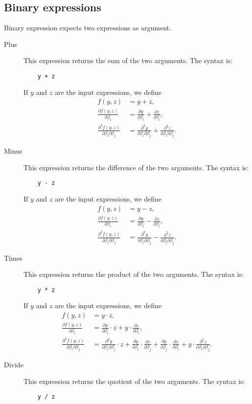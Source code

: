 \documentclass[12pt,a4paper]{article}
\begin{document}
\subsection{Binary expressions}
Binary expression expects two expressions as argument.   

\begin{description}
\item[Plus] This expression returns the sum of the two arguments. The syntax is: 
  \begin{lstlisting}
    y + z
  \end{lstlisting}
  If $y$ and $z$ are the input expressions, we define
  \begin{align*}
    f(y, z) &= y + z, \\
    \frac{\partial f(y, z)}{\partial \beta_i} &= \frac{\partial y}{\partial \beta_i} + \frac{\partial z}{\partial \beta_i}, \\
    \frac{\partial^2 f(y, z)}{\partial \beta_i\partial \beta_j} &=
    \frac{\partial^2 y}{\partial \beta_i \partial \beta_j} + \frac{\partial^2 z}{\partial \beta_i \partial \beta_j}.
  \end{align*}
\item[Minus] This expression returns the difference of the two arguments. The syntax is: 
  \begin{lstlisting}
    y - z
  \end{lstlisting}
  If $y$ and $z$ are the input expressions, we define
  \begin{align*}
    f(y, z) &= y - z, \\
    \frac{\partial f(y, z)}{\partial \beta_i} &= \frac{\partial y}{\partial \beta_i} - \frac{\partial z}{\partial \beta_i}, \\
    \frac{\partial^2 f(y, z)}{\partial \beta_i\partial \beta_j} &=
    \frac{\partial^2 y}{\partial \beta_i \partial \beta_j} - \frac{\partial^2 z}{\partial \beta_i \partial \beta_j}.
  \end{align*}
\item[Times] This expression returns the product of the two arguments. The syntax is: 
  \begin{lstlisting}
    y * z
  \end{lstlisting}
  If $y$ and $z$ are the input expressions, we define
  \begin{align*}
    f(y, z) &= y \cdot z, \\
    \frac{\partial f(y, z)}{\partial \beta_i} &= \frac{\partial y}{\partial \beta_i} \cdot z + y \cdot \frac{\partial z}{\partial \beta_i}, \\
    \frac{\partial^2 f(y, z)}{\partial \beta_i \partial \beta_j} &= \frac{\partial^2 y}{\partial \beta_i \partial \beta_j} \cdot z + \frac{\partial y}{\partial \beta_i} \cdot \frac{\partial z}{\partial \beta_j} + \frac{\partial y}{\partial \beta_j} \cdot \frac{\partial z}{\partial \beta_i} + y \cdot \frac{\partial^2 z}{\partial \beta_i \partial \beta_j}.
  \end{align*}
\item[Divide] This expression returns the quotient of the two arguments. The syntax is: 
  \begin{lstlisting}
    y / z
  \end{lstlisting}


\end{description}
\end{document}
